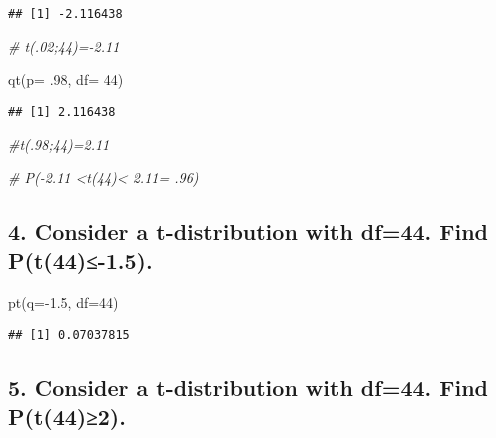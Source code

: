 \documentclass[
]{article}
\newenvironment{Shaded}{\begin{snugshade}}{\end{snugshade}}
\newcommand{\AttributeTok}[1]{\textcolor[rgb]{0.77,0.63,0.00}{#1}}
\newcommand{\CommentTok}[1]{\textcolor[rgb]{0.56,0.35,0.01}{\textit{#1}}}
\newcommand{\DecValTok}[1]{\textcolor[rgb]{0.00,0.00,0.81}{#1}}
\newcommand{\FloatTok}[1]{\textcolor[rgb]{0.00,0.00,0.81}{#1}}
\newcommand{\FunctionTok}[1]{\textcolor[rgb]{0.00,0.00,0.00}{#1}}
\newcommand{\NormalTok}[1]{#1}
\newcommand{\SpecialCharTok}[1]{\textcolor[rgb]{0.00,0.00,0.00}{#1}}
\begin{document}
\begin{verbatim}
## [1] -2.116438
\end{verbatim}

\begin{Shaded}
\begin{Highlighting}[]
\CommentTok{\# t(.02;44)={-}2.11}

\FunctionTok{qt}\NormalTok{(}\AttributeTok{p=}\NormalTok{ .}\DecValTok{98}\NormalTok{, }\AttributeTok{df=} \DecValTok{44}\NormalTok{)}
\end{Highlighting}
\end{Shaded}

\begin{verbatim}
## [1] 2.116438
\end{verbatim}

\begin{Shaded}
\begin{Highlighting}[]
\CommentTok{\#t(.98;44)=2.11}

\CommentTok{\# P({-}2.11 \textless{}t(44)\textless{} 2.11= .96)}
\end{Highlighting}
\end{Shaded}

\hypertarget{consider-a-t-distribution-with-df44.-find-pt44-1.5.}{%
\subsection{4. Consider a t-distribution with df=44. Find
P(t(44)≤-1.5).}\label{consider-a-t-distribution-with-df44.-find-pt44-1.5.}}

\begin{Shaded}
\begin{Highlighting}[]
\FunctionTok{pt}\NormalTok{(}\AttributeTok{q=}\SpecialCharTok{{-}}\FloatTok{1.5}\NormalTok{, }\AttributeTok{df=}\DecValTok{44}\NormalTok{)}
\end{Highlighting}
\end{Shaded}

\begin{verbatim}
## [1] 0.07037815
\end{verbatim}

\hypertarget{consider-a-t-distribution-with-df44.-find-pt442.}{%
\subsection{5. Consider a t-distribution with df=44. Find
P(t(44)≥2).}\label{consider-a-t-distribution-with-df44.-find-pt442.}}
\end{document}
